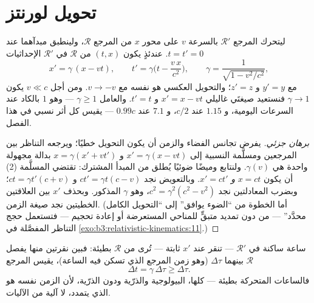 \section{تحويل لورنتز}

\begin{theorem}\label{thm:b3:relativistic-kinematics:lorentz}
ليتحرك المرجع $\mathcal R'$ بالسرعة $v$ على محور $x$ من
المرجع $\mathcal R$، ولينطبق مبدآهما عند $t = t' = 0$. عندئذٍ
يكون  $(t, x)$ من $\mathcal R$ في $\mathcal R'$ الإحداثيات
\[
x' = \gamma\,(x - vt) , \qquad
t' = \gamma\Big(t - \frac{v\,x}{c^2}\Big) , \qquad
\gamma = \frac{1}{\sqrt{1 - v^2/c^2}} ,
\]
مع $y' = y$ و $z' = z$؛ والتحويل العكسي هو نفسه مع
$v \to -v$. ومن أجل $v \ll c$ يكون $\gamma \to 1$ فنستعيد صيغتَي غاليلي
$x' = x - vt$ و $t' = t$. والعامل $\gamma \ge 1$ --- وهو $1$ بالكاد عند
السرعات اليومية، و $1.15$ عند $c/2$، و $7.1$ عند $0.99c$ --- يقيس كل
أثر نسبي في هذا الفصل.
\end{theorem}

\begin{proof}[برهان جزئي]
يفرض تجانس الفضاء والزمن أن يكون التحويل خطيًا؛ ويرجعه التناظر
بين المرجعين ومسلَّمة النسبية إلى
$x' = \gamma(x - vt)$ و $x = \gamma(x' + vt')$ بدالة مجهولة واحدة
هي $\gamma(v)$. ولنتابع وميضًا ضوئيًا يُطلق من المبدأ
المشترك: تقتضي المسلَّمة (2) أن يكون $x = ct$ \emph{و} $x' = ct'$.
وبالتعويض نجد $ct' = \gamma t(c - v)$ و $ct = \gamma t'(c + v)$؛
وبضرب المعادلتين نجد $c^2 = \gamma^2(c^2 - v^2)$، وهو
$\gamma$ المذكور. وبحذف $x'$ بين العلاقتين الخطيتين
نجد صيغة الزمن. (أما الخطوة من ``الضوء يوافق'' إلى ``التحويل
الكامل محدَّد'' --- من دون تمديد متبقٍّ للمناحي المستعرضة أو
إعادة تحجيم --- فتستعمل حجج التناظر المفصَّلة في
\cref{exo:b3:relativistic-kinematics:11}.)
\end{proof}

\begin{proposition}\label{prop:b3:relativistic-kinematics:dilation}
ساعة ساكنة في $\mathcal R'$ --- تنقر عند $x'$ ثابتة --- تُرى
من $\mathcal R$ بطيئة: فبين نقرتين منها يفصل بينهما
\emph{} $\Delta\tau$ (وهو زمن المرجع الذي تسكن فيه
الساعة)، يقيس المرجع $\mathcal R$
\[
\Delta t = \gamma\,\Delta\tau \ge \Delta\tau .
\]
فالساعات المتحركة بطيئة --- كلها، البيولوجية والذرّية ودون
الذرّية، لأن الزمن نفسه هو الذي يتمدد، لا آلية من الآليات.
\end{proposition}

